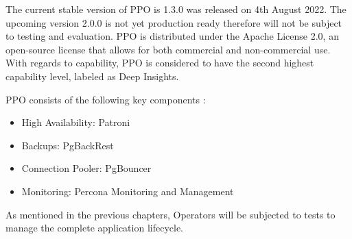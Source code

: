 The current stable version of PPO is 1.3.0 was released on 4th August 2022. The upcoming version 2.0.0 is not yet production ready therefore will not be subject to testing and evaluation. \cite{PerconaDocuV2} PPO is distributed under the Apache License 2.0, an open-source license that allows for both commercial and non-commercial use. With regards to capability, PPO is considered to have the second highest capability level, labeled as Deep Insights. \cite{OperatorHubPercona}

PPO consists of the following key components \cite{PostgresOnKubernetes}:
\begin{itemize}
  \item High Availability: Patroni
  \item Backups: PgBackRest
  \item Connection Pooler: PgBouncer
  \item Monitoring: Percona Monitoring and Management
\end{itemize}




As mentioned in the previous chapters, Operators will be subjected to tests to manage the complete application lifecycle.

